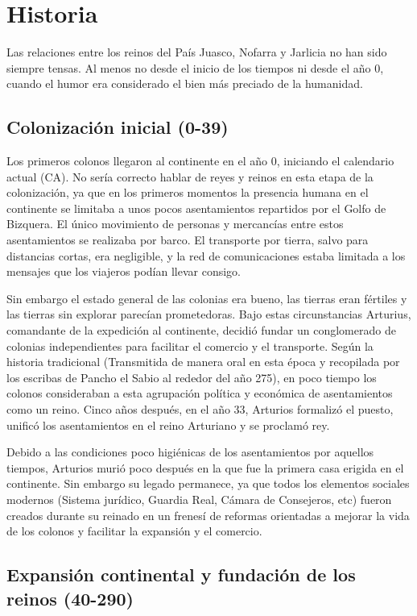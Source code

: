 \chapter{Historia}

Las relaciones entre los reinos del País Juasco, Nofarra y Jarlicia no han sido siempre tensas. Al menos no desde el inicio de los tiempos ni desde el año 0, cuando el humor era considerado el bien más preciado de la humanidad. 

\section*{Colonización inicial (0-39)}

Los primeros colonos llegaron al continente en el año 0, iniciando el calendario actual (CA). No sería correcto hablar de reyes y reinos en esta etapa de la colonización, ya que en los primeros momentos la presencia humana en el continente se limitaba a unos pocos asentamientos repartidos por el Golfo de Bizquera. El único movimiento de personas y mercancías entre estos asentamientos se realizaba por barco. El transporte por tierra, salvo para distancias cortas, era negligible, y la red de comunicaciones estaba limitada a los mensajes que los viajeros podían llevar consigo.
\par 
Sin embargo el estado general de las colonias era bueno, las tierras eran fértiles y las tierras sin explorar parecían prometedoras. Bajo estas circunstancias Arturius, comandante de la expedición al continente, decidió fundar un conglomerado de colonias independientes para facilitar el comercio y el transporte. Según la historia tradicional (Transmitida de manera oral en esta época y recopilada por los escribas de Pancho el Sabio al rededor del año 275), en poco tiempo los colonos consideraban a esta agrupación política y económica de asentamientos como un reino. Cinco años después, en el año 33, Arturios formalizó el puesto, unificó los asentamientos en el reino Arturiano y se proclamó rey.
\par 
Debido a las condiciones poco higiénicas de los asentamientos por aquellos tiempos, Arturios murió poco después en la que fue la primera casa erigida en el continente. Sin embargo su legado permanece, ya que todos los elementos sociales modernos (Sistema jurídico, Guardia Real, Cámara de Consejeros, etc) fueron creados durante su reinado en un frenesí de reformas orientadas a mejorar la vida de los colonos y facilitar la expansión y el comercio.

\section*{Expansión continental y fundación de los reinos (40-290)}

